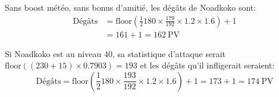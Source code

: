 \documentclass[12pt]{beamer}
\begin{document}
\begin{frame}
\begin{block}{}
\begin{footnotesize}
Sans boost météo, sans bonus d'amitié, les dégâts de Noadkoko sont:
\begin{align*}
\text{Dégâts} %
& = \text{floor}\left(\frac{1}{2}\text{180} \times \frac{\text{179}}{\text{192}}\times\text{1.2}\times\text{1.6}\right) +1 \\
& = 161 + 1 = 162~ \text{PV}
\end{align*}

Si Noadkoko est au niveau 40, sa statistique d'attaque serait $\text{floor}((230+15)\times0.7903) = 193$ et les dégâts qu'il infligerait seraient:
\[ \text{Dégâts} =  \text{floor}\left(\frac{1}{2}\text{180} \times \frac{\text{193}}{\text{192}}\times\text{1.2}\times\text{1.6}\right) +1 = 173+1 = 174~ \text{PV} \]
\end{footnotesize}
\end{block}
\end{frame}
\end{document}
